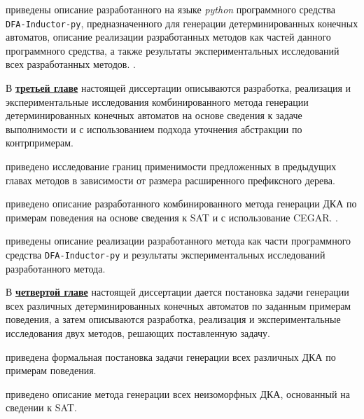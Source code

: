\insection{\ref{sec:space:results}} приведены описание разработанного  на языке \emph{python} программного средства \texttt{DFA-Inductor-py}, предназначенного для генерации детерминированных конечных автоматов, описание реализации разработанных методов как частей данного программного средства, а также результаты экспериментальных исследований всех разработанных методов.  .


В \textbf{\underline{третьей главе}} настоящей диссертации описываются разработка, реализация и экспериментальные исследования комбинированного метода генерации детерминированных конечных автоматов на основе сведения к задаче выполнимости и с использованием подхода уточнения абстракции по контрпримерам.

\insection{\ref{sec:cegar:motivation}} приведено исследование границ применимости предложенных в предыдущих главах методов в зависимости от размера расширенного префиксного дерева. 

\insection{\ref{sec:cegar:cegar-algo}} приведено описание разработанного комбинированного метода генерации ДКА по примерам поведения на основе сведения к SAT и с использование CEGAR. .

\insection{\ref{sec:cegar:results}} приведены описание реализации разработанного метода как части программного средства \texttt{DFA-Inductor-py} и результаты экспериментальных исследований разработанного метода. 


В \textbf{\underline{четвертой главе}} настоящей диссертации дается постановка задачи генерации всех различных детерминированных конечных автоматов по заданным примерам поведения, а затем описываются разработка, реализация и экспериментальные исследования двух методов, решающих поставленную задачу. 

\insection{\ref{sec:findall:problem}} приведена формальная постановка задачи генерации всех различных ДКА по примерам поведения.  

\insection{\ref{sec:findall:SAT-based}} приведено описание метода генерации всех неизоморфных ДКА, основанный на сведении к SAT.  

